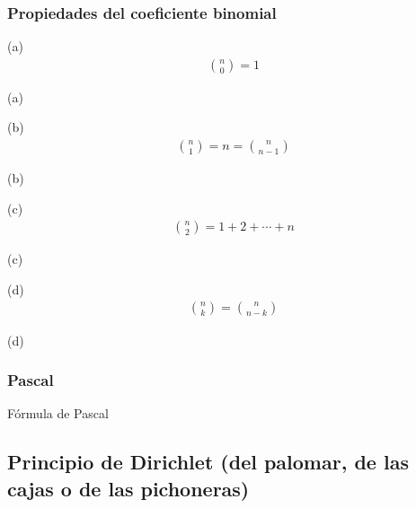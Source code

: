 		\subsubsection{Propiedades del coeficiente binomial}
			\begin{property}{(a)}
				\begin{align*}
					\binom{n}{0}=1
				\end{align*}    
			\end{property}
			\begin{demostration}{(a)}
				
			\end{demostration}
			\begin{property}{(b)}
				\begin{align*}
					\binom{n}{1}=n=\binom{n}{n-1}
				\end{align*}    
			\end{property}
			\begin{demostration}{(b)}
				
			\end{demostration}
			\begin{property}{(c)}
				\begin{align*}
					\binom{n}{2}=1+2+\dotsb+n
				\end{align*}    
			\end{property}
			\begin{demostration}{(c)}
				
			\end{demostration}
			\begin{property}{(d)}
				\begin{align*}
					\binom{n}{k}=\binom{n}{n-k}
				\end{align*}    
			\end{property}
			\begin{demostration}{(d)}
				
			\end{demostration}
		\subsubsection{Pascal}
			\begin{theorem}{Fórmula de Pascal}
				
			\end{theorem}    
	\subsection{Principio de Dirichlet (del palomar, de las cajas o de las pichoneras)}